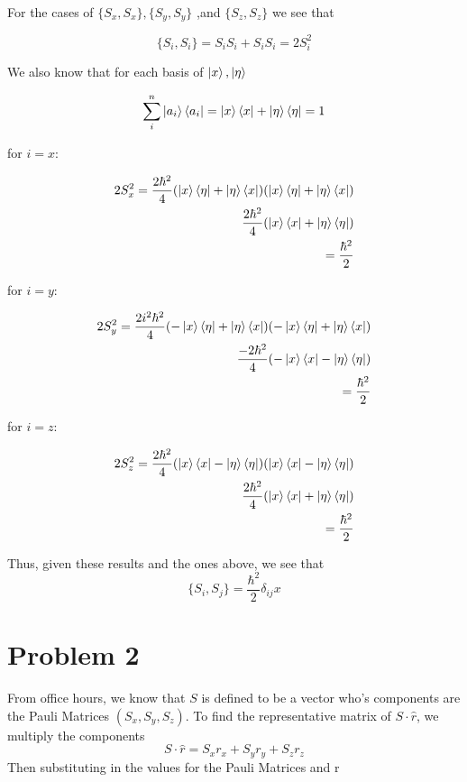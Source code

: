 \documentclass[]{article}
\begin{document}
For the cases of \(\{S_{x}, S_{x}\}, \{S_{y}, S_{y}\}\) ,and
\(\{S_{z}, S_{z}\}\) we see that

\[
\{S_{i}, S_{i}\} = S_{i}S_{i}+S_{i}S_{i}=2S_{i}^2
\]

We also know that for each basis of \(\ket{x}, \ket{\eta}\)

\[
\sum_{i}^n\ket{a_{i}}\bra{a_{i}} = \ket{x}\bra{x} +\ket{\eta}\bra{\eta}=1       
\]

for \(i=x\):

\[
\begin{align}
2S_{x}^2=\frac{2\hbar^2}{4}(\ket{x}\bra{\eta}+\ket{\eta}\bra{x})(\ket{x}\bra{\eta}+\ket{\eta}\bra{x}) \\
\frac{2\hbar^2}{4}(\ket{x}\bra{x}+\ket{\eta}\bra{\eta}) \\
=\frac{\hbar^2}{2}
\end{align}
\]

for \(i=y\):

\[
\begin{align}
2S_{y}^2=\frac{2i^2\hbar^2}{4}(-\ket{x}\bra{\eta}+\ket{\eta}\bra{x})(-\ket{x}\bra{\eta}+\ket{\eta}\bra{x}) \\
\frac{-2\hbar^2}{4}(-\ket{x}\bra{x}-\ket{\eta}\bra{\eta}) \\
=\frac{\hbar^2}{2}
\end{align}
\]

for \(i=z\):

\[
\begin{align}
2S_{z}^2=\frac{2\hbar^2}{4}(\ket{x}\bra{x}-\ket{\eta}\bra{\eta})(\ket{x}\bra{x}-\ket{\eta}\bra{\eta}) \\
\frac{2\hbar^2}{4}(\ket{x}\bra{x}+\ket{\eta}\bra{\eta}) \\
=\frac{\hbar^2}{2}
\end{align}
\]

Thus, given these results and the ones above, we see that \[
\{S_{i}, S_{j}\} = \frac{\hbar^2}{2}\delta_{ij}
x\]

\hypertarget{problem-2}{%
\section{Problem 2}\label{problem-2}}

From office hours, we know that \(S\) is defined to be a vector who's
components are the Pauli Matrices \(\left( S_{x},S_{y},S_{z} \right)\).
To find the representative matrix of \(S \cdot \hat{r}\), we multiply
the components \[
S\cdot \hat{r} = S_{x}r_{x}+ S_{y}r_{y}+ S_{z}r_{z}
\] Then substituting in the values for the Pauli Matrices and r
\end{document}
